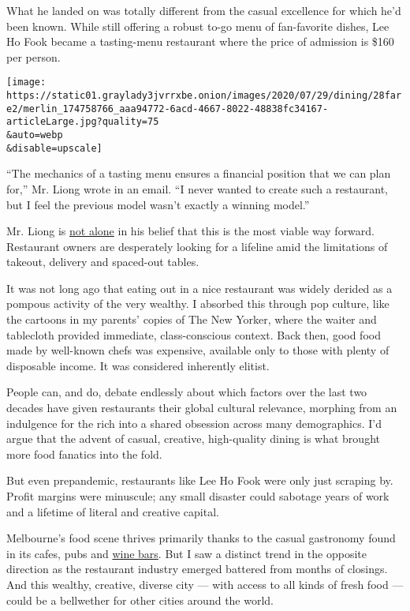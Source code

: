 What he landed on was totally different from the casual excellence for
which he'd been known. While still offering a robust to-go menu of
fan-favorite dishes, Lee Ho Fook became a tasting-menu restaurant where
the price of admission is \$160 per person.

\texttt{[image: https://static01.graylady3jvrrxbe.onion/images/2020/07/29/dining/28fare2/merlin\_174758766\_aaa94772-6acd-4667-8022-48838fc34167-articleLarge.jpg?quality=75\\\&auto=webp\\\&disable=upscale]}

``The mechanics of a tasting menu ensures a financial position that we
can plan for,'' Mr. Liong wrote in an email. ``I never wanted to create
such a restaurant, but I feel the previous model wasn't exactly a
winning model.''

Mr. Liong is
\href{https://www.nytimes3xbfgragh.onion/2020/07/28/dining/ever-chicago-restaurant-coronavirus.html}{not
alone} in his belief that this is the most viable way forward.
Restaurant owners are desperately looking for a lifeline amid the
limitations of takeout, delivery and spaced-out tables.

It was not long ago that eating out in a nice restaurant was widely
derided as a pompous activity of the very wealthy. I absorbed this
through pop culture, like the cartoons in my parents' copies of The New
Yorker, where the waiter and tablecloth provided immediate,
class-conscious context. Back then, good food made by well-known chefs
was expensive, available only to those with plenty of disposable income.
It was considered inherently elitist.

People can, and do, debate endlessly about which factors over the last
two decades have given restaurants their global cultural relevance,
morphing from an indulgence for the rich into a shared obsession across
many demographics. I'd argue that the advent of casual, creative,
high-quality dining is what brought more food fanatics into the fold.

But even prepandemic, restaurants like Lee Ho Fook were only just
scraping by. Profit margins were minuscule; any small disaster could
sabotage years of work and a lifetime of literal and creative capital.

Melbourne's food scene thrives primarily thanks to the casual gastronomy
found in its cafes, pubs and
\href{https://www.nytimes3xbfgragh.onion/2019/10/30/dining/melbourne-wine-bars-restaurants.html}{wine
bars}. But I saw a distinct trend in the opposite direction as the
restaurant industry emerged battered from months of closings. And this
wealthy, creative, diverse city --- with access to all kinds of fresh
food --- could be a bellwether for other cities around the world.

